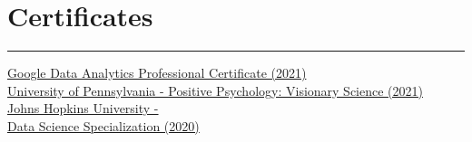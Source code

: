 \documentclass[]{meetresume-class}
\begin{document}
\begin{minipage}[t]{0.33\textwidth}
		\section{Certificates}
		\noindent\rule{5cm}{0.6pt}
		
		\href{https://coursera.org/share/76b19df91a43554894965d5aa7a82254}{Google Data Analytics Professional Certificate (2021)}\\
		\href{https://coursera.org/share/34576e12fe5880c5e3382c8a91b56564}{University of Pennsylvania - Positive Psychology: Visionary Science (2021)}\\
		\href{https://coursera.org/share/3dbc74a447f9ca4efc319aefd14efa33}{Johns Hopkins University - \\Data Science Specialization (2020)}\\
		
	\end{minipage} 
	\hfill
\end{document}
